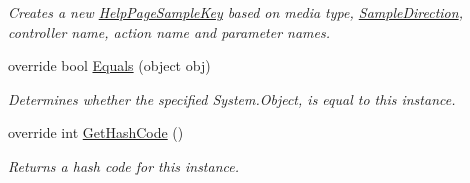 \begin{DoxyCompactItemize}
\begin{DoxyCompactList}\small\item\em Creates a new \hyperlink{class_open_1_1_g_i_1_1hypermart_1_1_areas_1_1_help_page_1_1_help_page_sample_key}{Help\+Page\+Sample\+Key} based on media type, \hyperlink{class_open_1_1_g_i_1_1hypermart_1_1_areas_1_1_help_page_1_1_help_page_sample_key_a62a3b3c50ce55cf2b20b4f859776f884}{Sample\+Direction}, controller name, action name and parameter names. \end{DoxyCompactList}\item 
override bool \hyperlink{class_open_1_1_g_i_1_1hypermart_1_1_areas_1_1_help_page_1_1_help_page_sample_key_a6f27772d78ce8643c31153497bdff9b7}{Equals} (object obj)
\begin{DoxyCompactList}\small\item\em Determines whether the specified System.\+Object, is equal to this instance. \end{DoxyCompactList}\item 
override int \hyperlink{class_open_1_1_g_i_1_1hypermart_1_1_areas_1_1_help_page_1_1_help_page_sample_key_a232891dfae35aa54606577e755c3b3c3}{Get\+Hash\+Code} ()
\begin{DoxyCompactList}\small\item\em Returns a hash code for this instance. \end{DoxyCompactList}\end{DoxyCompactItemize}
